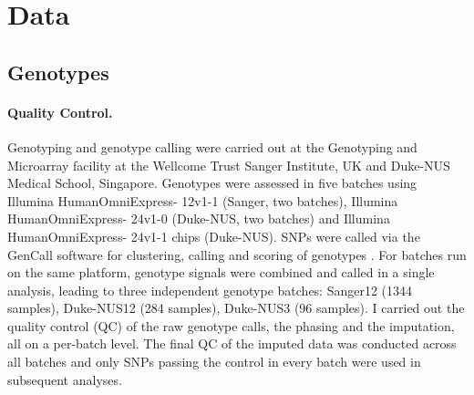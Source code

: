 \section{Data}
\subsection{Genotypes}
\label{subsection:genotypes}
\paragraph{Quality Control.} Genotyping and genotype calling were carried out at the Genotyping and Microarray facility at the Wellcome Trust Sanger Institute, UK and Duke-NUS Medical School, Singapore. Genotypes were assessed in five batches using Illumina HumanOmniExpress- 12v1-1 (Sanger, two batches), Illumina HumanOmniExpress- 24v1-0 (Duke-NUS, two batches) and Illumina HumanOmniExpress- 24v1-1 chips (Duke-NUS). SNPs were called via the GenCall software for clustering, calling and scoring of genotypes \citep{Teo2007}. For batches run on the same platform, genotype signals were combined and called in a single analysis, leading to three independent genotype batches: Sanger12 (\num{1344} samples), Duke-NUS12 (\num{284} samples), Duke-NUS3 (\num{96} samples). I carried out the quality control (QC) of the raw genotype calls, the phasing and the imputation, all on a per-batch level. The final QC of the imputed data was conducted across all batches and only SNPs passing the control in every batch were used in subsequent analyses. 

